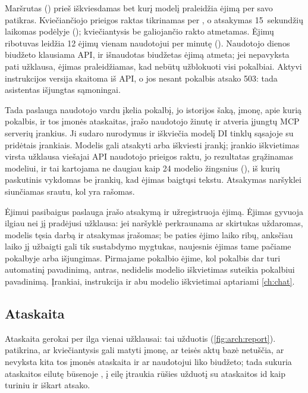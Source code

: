 Maršrutas () prieš iškviesdamas bet kurį modelį praleidžia ėjimą per
savo patikras. Kviečiančiojo prieigos raktas tikrinamas per , o
atsakymas 15~sekundžių laikomas podėlyje (); kviečiantysis be
galiojančio rakto atmetamas. Ėjimų ribotuvas leidžia 12 ėjimų vienam naudotojui per minutę
(). Naudotojo dienos biudžeto klausiama API, ir išnaudotas biudžetas
ėjimą atmeta; jei nepavyksta pati užklausa, ėjimas praleidžiamas, kad nebūtų užblokuoti visi
pokalbiai. Aktyvi instrukcijos  versija skaitoma iš API, o jos nesant
pokalbis atsako 503: tada asistentas išjungtas sąmoningai.

Tada paslauga naudotojo vardu įkelia pokalbį, jo istorijos šaką, įmonę, apie kurią pokalbis,
ir tos įmonės ataskaitas, įrašo naudotojo žinutę ir atveria įjungtų MCP serverių įrankius. Ji
sudaro nurodymus ir iškviečia modelį DI tinklų sąsajoje su pridėtais įrankiais. Modelis gali
atsakyti arba iškviesti įrankį; įrankio iškvietimas virsta užklausa viešajai API naudotojo
prieigos raktu, jo rezultatas grąžinamas modeliui, ir tai kartojama ne daugiau kaip 24 modelio
žingsnius (), iš kurių paskutinis vykdomas be įrankių, kad ėjimas baigtųsi
tekstu. Atsakymas naršyklei siunčiamas srautu, kol yra rašomas.

Ėjimui pasibaigus paslauga įrašo atsakymą ir užregistruoja ėjimą. Ėjimas gyvuoja ilgiau nei
jį pradėjusi užklausa: jei naršyklė perkraunama ar skirtukas uždaromas, modelis tęsia darbą ir
atsakymas įrašomas; be paties ėjimo laiko ribų, anksčiau laiko jį užbaigti gali tik
sustabdymo mygtukas, naujesnis ėjimas tame pačiame pokalbyje arba išjungimas. Pirmajame
pokalbio ėjime, kol pokalbis dar turi automatinį pavadinimą, antras, nedidelis modelio
iškvietimas suteikia pokalbiui pavadinimą. Įrankiai, instrukcija ir abu modelio iškvietimai
aptariami \cref{ch:chat}.

\subsection{Ataskaita}

Ataskaita gerokai per ilga vienai užklausai: tai užduotis (\cref{fig:arch:report}).
 patikrina, ar kviečiantysis gali matyti įmonę, ar teisės aktų bazė
netuščia, ar nevyksta kita tos įmonės ataskaita ir ar naudotojui liko biudžeto; tada sukuria
ataskaitos eilutę būsenoje , į eilę įtraukia  rūšies užduotį
su ataskaitos id kaip turiniu ir iškart atsako.

